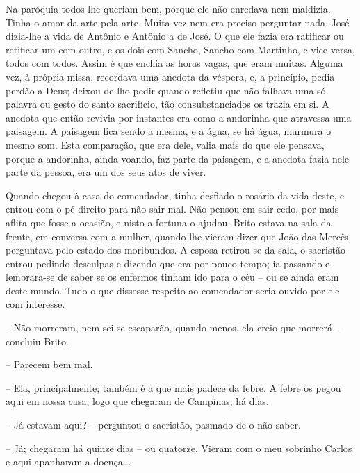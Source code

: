 Na paróquia todos lhe queriam bem, porque ele não enredava nem maldizia.
Tinha o amor da arte pela arte. Muita vez nem era preciso perguntar
nada. José dizia-lhe a vida de Antônio e Antônio a de José. O que ele
fazia era ratificar ou retificar um com outro, e os dois com Sancho,
Sancho com Martinho, e vice-versa, todos com todos. Assim é que enchia
as horas vagas, que eram muitas. Alguma vez, à própria missa, recordava
uma anedota da véspera, e, a princípio, pedia perdão a Deus; deixou de
lho pedir quando refletiu que não falhava uma só palavra ou gesto do
santo sacrifício, tão consubstanciados os trazia em si. A anedota que
então revivia por instantes era como a andorinha que atravessa uma
paisagem. A paisagem fica sendo a mesma, e a água, se há água, murmura o
mesmo som. Esta comparação, que era dele, valia mais do que ele pensava,
porque a andorinha, ainda voando, faz parte da paisagem, e a anedota
fazia nele parte da pessoa, era um dos seus atos de viver.

Quando chegou à casa do comendador, tinha desfiado o rosário da vida
deste, e entrou com o pé direito para não sair mal. Não pensou em sair
cedo, por mais aflita que fosse a ocasião, e nisto a fortuna o ajudou.
Brito estava na sala da frente, em conversa com a mulher, quando lhe
vieram dizer que João das Mercês perguntava pelo estado dos moribundos.
A esposa retirou-se da sala, o sacristão entrou pedindo desculpas e
dizendo que era por pouco tempo; ia passando e lembrara-se de saber se
os enfermos tinham ido para o céu -- ou se ainda eram deste mundo. Tudo
o que dissesse respeito ao comendador seria ouvido por ele com
interesse.

-- Não morreram, nem sei se escaparão, quando menos, ela creio que
morrerá -- concluiu Brito.

-- Parecem bem mal.

-- Ela, principalmente; também é a que mais padece da febre. A febre os
pegou aqui em nossa casa, logo que chegaram de Campinas, há dias.

-- Já estavam aqui? -- perguntou o sacristão, pasmado de o não saber.

-- Já; chegaram há quinze dias -- ou quatorze. Vieram com o meu sobrinho
Carlos e aqui apanharam a doença...

